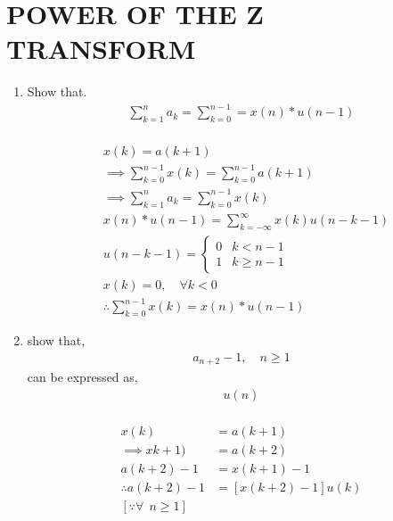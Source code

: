 \documentclass[journal,12pt,twocolumn]{IEEEtran}
\renewcommand\thesection{\arabic{section}}
\begin{document}
\section{POWER OF THE Z TRANSFORM}
\begin{enumerate}[label=\thesection.\arabic*,ref=\thesection.\theenumi]
	
	\item Show that.
		\begin{align}
			\sum_{k=1}^{n} a_k = \sum_{k=0}^{n-1} = x(n) * u(n-1)
		\end{align}
	\solution\\
		\begin{align}
			& x(k) = a(k+1)\\
			& \implies \sum_{k=0}^{n-1} x(k) = \sum_{k=0}^{n-1} a(k+1)\\
			& \implies \sum_{k=1}^{n} a_k = \sum_{k=0}^{n-1} x(k)\\
			& x(n) * u(n-1) = \sum_{k=-\infty}^{\infty} x(k)u(n-k-1)\\
			& u(n-k-1) = 
			\begin{cases}
				0 & k < n-1\\
				1 & k \ge n-1
			\end{cases}\\
			& x(k) = 0, \quad \forall k < 0\\
			& \therefore \sum_{k=0}^{n-1} x(k) = x(n) * u(n-1)
		\end{align}
	
	\item 
		show that,
		\begin{align}
			a_{n+2} -1, \quad n \ge 1
		\end{align}
		can be expressed as,
		\begin{align}
			[x(n+1) -1]u(n)
		\end{align}
	\solution\\
		\begin{align}
			x(k) & = a(k+1) \\ 
			\implies xk+1) & = a(k+2)\\
			a(k+2) -1 & = x(k+1)-1 \\
			\therefore a(k+2)-1 & = [x(k+2)  -1]u(k) \\
			[\because \forall \ \ n \ge 1]
		\end{align}


\end{enumerate}
\end{document}
